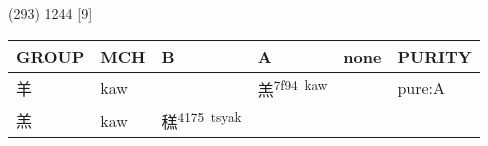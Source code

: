 \documentclass[14pt,a4paper]{scrartcl}
\begin{document}
(293) 1244 {[}9{]}

\begin{longtable}[c]{@{}llllll@{}}
\toprule
\begin{minipage}[b]{0.14\columnwidth}\raggedright\strut
GROUP
\strut\end{minipage} &
\begin{minipage}[b]{0.14\columnwidth}\raggedright\strut
MCH
\strut\end{minipage} &
\begin{minipage}[b]{0.14\columnwidth}\raggedright\strut
B
\strut\end{minipage} &
\begin{minipage}[b]{0.14\columnwidth}\raggedright\strut
A
\strut\end{minipage} &
\begin{minipage}[b]{0.14\columnwidth}\raggedright\strut
none
\strut\end{minipage} &
\begin{minipage}[b]{0.14\columnwidth}\raggedright\strut
PURITY
\strut\end{minipage}\tabularnewline
\midrule
\endhead
\begin{minipage}[t]{0.14\columnwidth}\raggedright\strut
羊
\strut\end{minipage} &
\begin{minipage}[t]{0.14\columnwidth}\raggedright\strut
kaw
\strut\end{minipage} &
\begin{minipage}[t]{0.14\columnwidth}\raggedright\strut
\strut\end{minipage} &
\begin{minipage}[t]{0.14\columnwidth}\raggedright\strut
羔\textsuperscript{7f94~kaw}
\strut\end{minipage} &
\begin{minipage}[t]{0.14\columnwidth}\raggedright\strut
\strut\end{minipage} &
\begin{minipage}[t]{0.14\columnwidth}\raggedright\strut
pure:A
\strut\end{minipage}\tabularnewline
\begin{minipage}[t]{0.14\columnwidth}\raggedright\strut
羔
\strut\end{minipage} &
\begin{minipage}[t]{0.14\columnwidth}\raggedright\strut
kaw
\strut\end{minipage} &
\begin{minipage}[t]{0.14\columnwidth}\raggedright\strut
䅵\textsuperscript{4175~tsyak}

\end{minipage}
\end{longtable}
\end{document}
